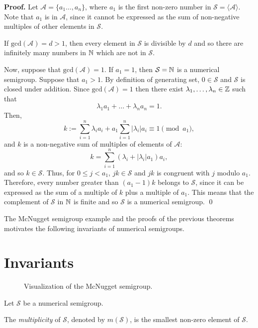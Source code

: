 \textbf{Proof. } Let $\mathcal{A} = \{a_{1} \ldots, a_{n}\}$, where $a_1$ is the first non-zero number in $\mathcal{S} = \langle \mathcal{A} \rangle$. Note that $a_1$ is in $\mathcal{A}$, since it cannot be expressed as the sum of non-negative multiples of other elements in $\mathcal{S}$. \par
If $\mathrm{gcd}(\mathcal{A}) = d > 1$, then every element in $\mathcal{S}$ is divisible by $d$ and so there are infinitely many numbers in $\mathbb{N}$ which are not in $\mathcal{S}$. \par
Now, suppose that $\mathrm{gcd}(\mathcal{A}) = 1$. If $a_1 = 1$, then $\mathcal{S} = \mathbb{N}$ is a numerical semigroup. Suppose that $a_1 > 1$. By definition of generating set, $0 \in \mathcal{S}$ and $\mathcal{S}$ is closed under addition. Since $\mathrm{gcd}(\mathcal{A}) = 1$ then there exist $\lambda_1, \ldots, \lambda_n \in \mathbb{Z}$ such that 
\[\lambda_1a_1 + \ldots + \lambda_na_n = 1.\]
Then, 
\[
    k := \sum_{i = 1}^n \lambda_ia_i + a_1\sum_{i = 1}^n|\lambda_i|a_i \equiv 1 \pmod{a_1},
\]
and $k$ is a non-negative sum of multiples of elements of $\mathcal{A}$: 
\[k = \sum_{i = 1}^n (\lambda_i + |\lambda_i|a_1)a_i,\]
and so $k \in \mathcal{S}$. Thus, for $0 \leq j < a_1$, $jk \in \mathcal{S}$ and $jk$ is congruent with $j$ modulo $a_1$. Therefore, every number greater than $(a_1 - 1)k$ belongs to $\mathcal{S}$, since it can be expressed as the sum of a multiple of $k$ plus a multiple of $a_1$.  This means that the complement of $\mathcal{S}$ in $\mathbb{N}$ is finite and so $\mathcal{S}$ is a numerical semigroup. \qed \par

The McNugget semigroup example and the proofs of the previous theorems motivates the following invariants of numerical semigroups. \par 

\section{Invariants}\label{sec:smgps:invariants}

\begin{figure}
    \centering
    
    \caption{Visualization of the McNugget semigroup.}
    \label{fig:smgps:mcnugget}
\end{figure}

Let $\mathcal{S}$ be a numerical semigroup. \par

\begin{definition}\label{def:smgps:multiplicity}
    The \textit{multiplicity} of $\mathcal{S}$, denoted by $m(\mathcal{S})$, is the smallest non-zero element of $\mathcal{S}$.
\end{definition}

